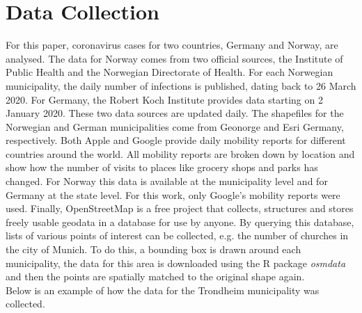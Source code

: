 %

\chapter{Data Collection}
\label{sec:data}
For this paper, coronavirus cases for two countries, Germany and Norway, are analysed. The data for Norway comes from two official sources, the Institute of Public Health and the Norwegian Directorate of Health\autocite[Cf.][]{fhi}. For each Norwegian municipality, the daily number of infections is published, dating back to 26 March 2020. For Germany, the Robert Koch Institute\autocite[Cf.][]{rki} provides data starting on 2 January 2020. These two data sources are updated daily. The shapefiles for the Norwegian and German municipalities come from Geonorge\autocite[Cf.][]{geonorge} and Esri Germany\autocite[Cf.][]{opendata}, respectively. Both Apple and Google\autocite[Cf.][]{google_mobility} provide daily mobility reports for different countries around the world. All mobility reports are broken down by location and show how the number of visits to places like grocery shops and parks has changed. For Norway this data is available at the municipality level and for Germany at the state level. For this work, only Google's mobility reports were used. Finally, OpenStreetMap\autocite[Cf.][]{OpenStreetMap} is a free project that collects, structures and stores freely usable geodata in a database for use by anyone. By querying this database, lists of various points of interest can be collected, e.g. the number of churches in the city of Munich. To do this, a bounding box is drawn around each municipality, the data for this area is downloaded using the R package \textit{osmdata}\autocite[Cf.][]{osmdata} and then the points are spatially matched to the original shape again. \\
Below is an example of how the data for the Trondheim municipality was collected.